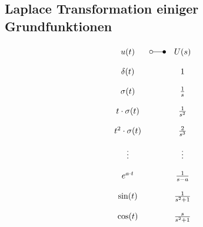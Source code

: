 \subsection{Laplace Transformation einiger Grundfunktionen}
\[ \begin{array}{ccc}
u(t) & \laplace & U(s) \\\\
\delta(t) & 
    & 1 \\\\
\sigma(t) & 
    & \frac{1}{s} \\\\
t \cdot \sigma(t) & 
    & \frac{1}{s^2} \\\\
t^2 \cdot \sigma(t) & 
    & \frac{2}{s^3} \\\\
\vdots & 
    & \vdots \\\\
e^{a \cdot t} & 
    & \frac{1}{s - a} \\\\
\sin(t) & 
    & \frac{1}{s^2 + 1} \\\\
\cos(t) & 
    & \frac{s}{s^2 + 1} \\\\
\end{array} \]


